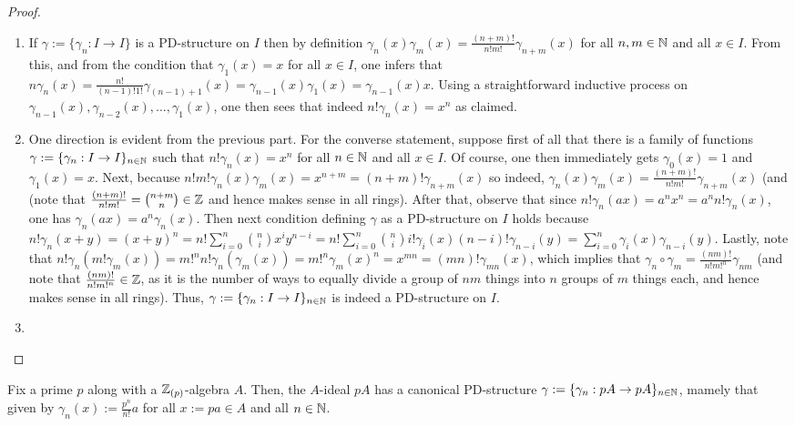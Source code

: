                 \begin{proof}
                    \noindent
                    \begin{enumerate}
                        \item If $\gamma := \{\gamma_n: I \to I\}$ is a PD-structure on $I$ then by definition $\gamma_n(x) \gamma_m(x) = \frac{(n + m)!}{n! m!} \gamma_{n + m}(x)$ for all $n, m \in \mathbb{N}$ and all $x \in I$. From this, and from the condition that $\gamma_1(x) = x$ for all $x \in I$, one infers that $n \gamma_n(x) = \frac{n!}{(n - 1)! 1!} \gamma_{(n - 1) + 1}(x) = \gamma_{n - 1}(x) \gamma_1(x) = \gamma_{n - 1}(x) x$. Using a straightforward inductive process on $\gamma_{n - 1}(x), \gamma_{n - 2}(x), ..., \gamma_1(x)$, one then sees that indeed $n! \gamma_n(x) = x^n$ as claimed.
                        \item One direction is evident from the previous part. For the converse statement, suppose first of all that there is a family of functions $\gamma := \{\gamma_n: I \to I\}_{n \in \mathbb{N}}$ such that $n! \gamma_n(x) = x^n$ for all $n \in \mathbb{N}$ and all $x \in I$. Of course, one then immediately gets $\gamma_0(x) = 1$ and $\gamma_1(x) = x$. Next, because $n! m! \gamma_n(x) \gamma_m(x) = x^{n + m} = (n + m)! \gamma_{n + m}(x)$ so indeed, $\gamma_n(x) \gamma_m(x) = \frac{(n + m)!}{n! m!} \gamma_{n + m}(x)$ (and (note that $\frac{(n + m)!}{n! m!} = \binom{n + m}{n} \in \mathbb{Z}$ and hence makes sense in all rings). After that, observe that since $n! \gamma_n(ax) = a^n x^n = a^n n! \gamma_n(x)$, one has $\gamma_n(ax) = a^n \gamma_n(x)$. Then next condition defining $\gamma$ as a PD-structure on $I$ holds because $n! \gamma_n(x + y) = (x + y)^n = n! \sum_{i = 0}^n \binom{n}{i} x^i y^{n - i} = n! \sum_{i = 0}^n \binom{n}{i} i! \gamma_i(x) (n - i)! \gamma_{n - i}(y) = \sum_{i = 0}^n \gamma_i(x) \gamma_{n - i}(y)$. Lastly, note that $n!\gamma_n(m!\gamma_m(x)) = m!^n n!\gamma_n(\gamma_m(x)) = m!^n \gamma_m(x)^n = x^{mn} = (mn)! \gamma_{mn}(x)$, which implies that $\gamma_n \circ \gamma_m = \frac{(nm)!}{n! m!^n} \gamma_{nm}$ (and note that $\frac{(nm)!}{n! m!^n} \in \mathbb{Z}$, as it is the number of ways to equally divide a group of $nm$ things into $n$ groups of $m$ things each, and hence makes sense in all rings). Thus, $\gamma := \{\gamma_n: I \to I\}_{n \in \mathbb{N}}$ is indeed a PD-structure on $I$.
                        \item  
                    \end{enumerate}
                \end{proof}
            \begin{example}
                Fix a prime $p$ along with a $\mathbb{Z}_{(p)}$-algebra $A$. Then, the $A$-ideal $pA$ has a canonical PD-structure $\gamma := \{\gamma_n: pA \to pA\}_{n \in \mathbb{N}}$, mamely that given by $\gamma_n(x) := \frac{p^n}{n!} a$ for all $x := p a \in A$ and all $n \in \mathbb{N}$.
            \end{example}

